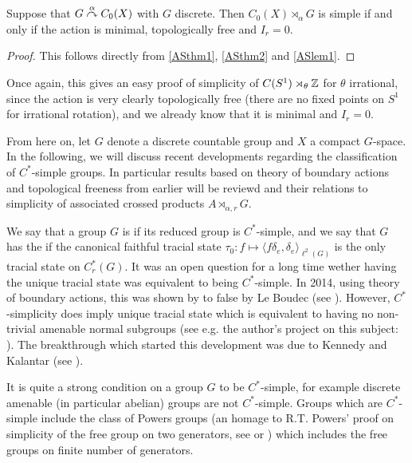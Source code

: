 \begin{corollary}
	Suppose that $G \stackrel{\alpha}{\curvearrowright} C_0(X)$ with $G$ discrete. Then $C_0(X) \rtimes_\alpha G$ is simple if and only if the action is minimal, topologically free and $I_r = 0$.
\end{corollary}
\begin{proof}
	This follows directly from \cref{ASthm1}, \cref{ASthm2} and \cref{ASlem1}.
\end{proof}
Once again, this gives an easy proof of simplicity of $C(S^1) \rtimes_{\theta} \mathbb{Z}$ for $\theta$ irrational, since the action is very clearly topologically free (there are no fixed points on $S^1$ for irrational rotation), and we already know that it is minimal and $I_r = 0$.

From here on, let $G$ denote a discrete countable group and $X$ a compact $G$-space. In the following, we will discuss recent developments regarding the classification of $C^*$-simple groups. In particular results based on theory of boundary actions and topological freeness from earlier will be reviewd and their relations to simplicity of associated crossed products $A \rtimes_{\alpha,r} G$. 

We say that a group $G$ is  if its reduced group is $C^*$-simple, and we say that $G$ has the  if the canonical faithful tracial state $\tau_0 \colon f \mapsto \langle f\delta_e  , \delta_e\rangle_{\ell^2(G)}$ is the only tracial state on $C_r^*(G)$. It was an open question for a long time wether having the unique tracial state was equivalent to being $C^*$-simple. In 2014, using theory of boundary actions, this was shown by to false by Le Boudec (see \cite[Thoerem A]{le2017c}). However, $C^*$-simplicity does imply unique tracial state which is equivalent to having no non-trivial amenable normal subgroups (see e.g. the author's project on this subject: \cite[Chapter 5]{bscp}). The breakthrough which started this development was due to Kennedy and Kalantar (see \cite{kalantar2017boundaries}).

It is quite a strong condition on a group $G$ to be $C^*$-simple, for example discrete amenable (in particular abelian) groups are not $C^*$-simple. Groups which are $C^*$-simple include the class of Powers groups (an homage to R.T. Powers' proof on simplicity of the free group on two generators, see \cite{powers1975simplicity} or \cite[chapter 3]{bscp}) which includes the free groups on finite number of generators.

